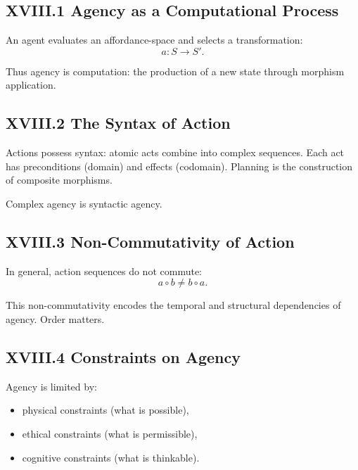 \documentclass[11pt,letterpaper]{article}
\begin{document}
\subsection{XVIII.1 Agency as a Computational Process}

An agent evaluates an affordance-space and selects a transformation:
\[
a: S \to S'.
\]

Thus agency is computation: the production of a new state through morphism application.

\subsection{XVIII.2 The Syntax of Action}

Actions possess syntax: atomic acts combine into complex sequences. Each act has preconditions (domain) and effects (codomain). Planning is the construction of composite morphisms.

Complex agency is syntactic agency.

\subsection{XVIII.3 Non-Commutativity of Action}

In general, action sequences do not commute:
\[
a \circ b \neq b \circ a.
\]

This non-commutativity encodes the temporal and structural dependencies of agency. Order matters.

\subsection{XVIII.4 Constraints on Agency}

Agency is limited by:

\begin{itemize}
    \item physical constraints (what is possible),
    \item ethical constraints (what is permissible),
    \item cognitive constraints (what is thinkable).
\end{itemize}
\end{document}
